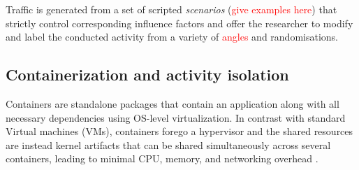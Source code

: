 \documentclass[runningheads]{llncs}
\begin{document}
Traffic is generated from a set of scripted \textit{scenarios} (\textcolor{red}{give examples here}) that strictly control corresponding influence factors and offer the researcher to modify and label the conducted activity from a variety of \textcolor{red}{angles} and randomisations. %

\subsection{Containerization and activity isolation}
Containers are standalone packages that contain an application along with all necessary dependencies using OS-level virtualization. In contrast with standard Virtual machines (VMs), containers forego a hypervisor and the shared resources are instead kernel artifacts that can be shared simultaneously across several containers, leading to minimal CPU, memory, and networking overhead \cite{kolyshkin2006virtualization}.
\end{document}
